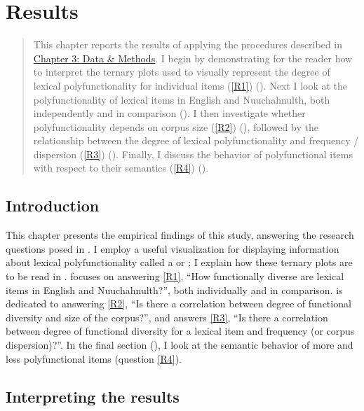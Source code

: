 \chapter{Results}
\label{ch:results}

\blockquote{This chapter reports the results of applying the procedures described in \hyperref[ch:methods]{Chapter 3: Data \& Methods}. I begin by demonstrating for the reader how to interpret the ternary plots used to visually represent the degree of lexical polyfunctionality for individual items (\ref{R1}) (). Next I look at the polyfunctionality of lexical items in English and Nuuchahnulth, both independently and in comparison (). I then investigate whether polyfunctionality depends on corpus size (\ref{R2}) (), followed by the relationship between the degree of lexical polyfunctionality and frequency / dispersion (\ref{R3}) (). Finally, I discuss the behavior of polyfunctional items with respect to their semantics (\ref{R4}) ().}

\section{Introduction}
\label{sec:4.1}

This chapter presents the empirical findings of this study, answering the research questions posed in . I employ a useful visualization for displaying information about lexical polyfunctionality called a  or ; I explain how these ternary plots are to be read in .  focuses on answering \ref{R1}, \enquote{How functionally diverse are lexical items in English and Nuuchahnulth?}, both individually and in comparison.  is dedicated to answering \ref{R2}, \enquote{Is there a correlation between degree of functional diversity and size of the corpus?}, and  answers \ref{R3}, \enquote{Is there a correlation between degree of functional diversity for a lexical item and frequency (or corpus dispersion)?}. In the final section (), I look at the semantic behavior of more and less polyfunctional items (question \ref{R4}).

\section{Interpreting the results}
\label{sec:4.2}

